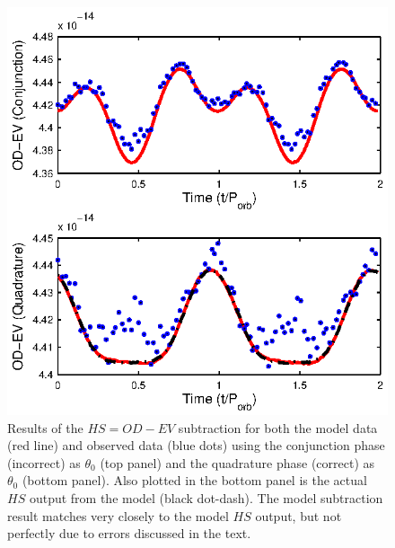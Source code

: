 \documentclass[preprint2]{aastex}
\begin{document}



\begin{figure}[h!]
\centering
\includegraphics[width=\columnwidth]{./AMCVnSubBoth.eps}
\caption{Results of the $HS = OD - EV$ subtraction for both the model data (red line) and observed data (blue dots) using the conjunction phase (incorrect) as $\theta_0$ (top panel) and the quadrature phase (correct) as $\theta_0$ (bottom panel). Also plotted in the bottom panel is the actual $HS$ output from the model (black dot-dash). The model subtraction result matches very closely to the model $HS$ output, but not perfectly due to errors discussed in the text.}
\label{fig.subt2}
\end{figure}
\end{document}
